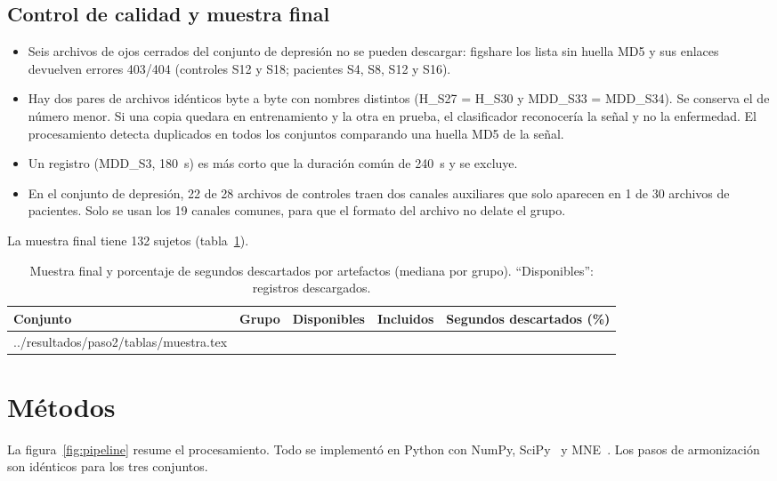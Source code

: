 \documentclass[11pt,a4paper]{article}
\makeatletter
\newcommand{\tabla}[1]{\@@input ../resultados/paso2/tablas/#1 }
\makeatother
\begin{document}
\subsection{Control de calidad y muestra final}
\begin{itemize}
  \item Seis archivos de ojos cerrados del conjunto de depresión no se pueden descargar: figshare los lista sin huella MD5 y sus enlaces devuelven errores 403/404 (controles S12 y S18; pacientes S4, S8, S12 y S16).
  \item Hay dos pares de archivos idénticos byte a byte con nombres distintos (H\_S27 = H\_S30 y MDD\_S33 = MDD\_S34). Se conserva el de número menor. Si una copia quedara en entrenamiento y la otra en prueba, el clasificador reconocería la señal y no la enfermedad. El procesamiento detecta duplicados en todos los conjuntos comparando una huella MD5 de la señal.
  \item Un registro (MDD\_S3, 180~s) es más corto que la duración común de 240~s y se excluye.
  \item En el conjunto de depresión, 22 de 28 archivos de controles traen dos canales auxiliares que solo aparecen en 1 de 30 archivos de pacientes. Solo se usan los 19 canales comunes, para que el formato del archivo no delate el grupo.
\end{itemize}
La muestra final tiene 132 sujetos (tabla~\ref{tab:muestra}).

\begin{table}[ht]
\centering\small
\caption{Muestra final y porcentaje de segundos descartados por artefactos (mediana por grupo). \enquote{Disponibles}: registros descargados.}
\label{tab:muestra}
\begin{tabular}{@{}llrrr@{}}
\toprule
Conjunto & Grupo & Disponibles & Incluidos & Segundos descartados (\%) \\
\midrule
\tabla{muestra.tex}
\bottomrule
\end{tabular}
\end{table}

\section{Métodos}

La figura~\ref{fig:pipeline} resume el procesamiento. Todo se implementó en Python con NumPy, SciPy~\cite{virtanen2020} y MNE~\cite{gramfort2013}. Los pasos de armonización son idénticos para los tres conjuntos.
\end{document}
